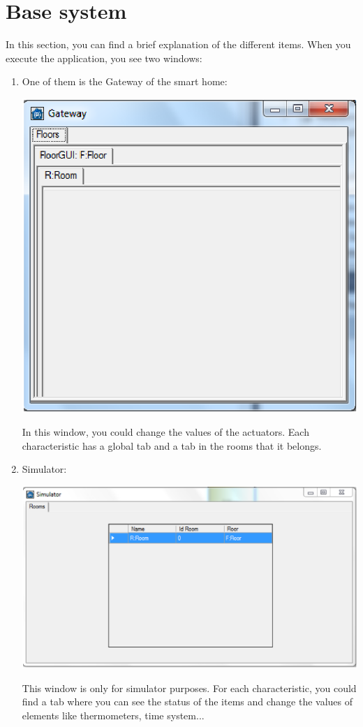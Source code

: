 \section{Base system}
In this section, you can find a brief explanation of the different items. When you execute the application, you see two windows:
\begin{enumerate}
\item One of them is the Gateway of the smart home:
\begin{center}
	\includegraphics[width=.55\linewidth]{images/gateway.eps}
	\\
	\vspace{1cm}
\end{center}
In this window, you could change the values of the actuators. Each characteristic has a global tab and a tab in the rooms that it belongs.
\item Simulator:
\begin{center}
	\includegraphics[width=.68\linewidth]{images/simulator.eps}
	\\
\vspace{1cm}
\end{center}
This window is only for simulator purposes. For each characteristic, you could find a tab where you can see the status of the items and change the values of elements like thermometers, time system...
\end{enumerate}